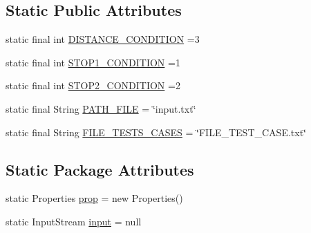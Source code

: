 \subsection*{Static Public Attributes}
\begin{DoxyCompactItemize}
\item 
static final int \hyperlink{classutilities_1_1_data_file_a7db48e719d69b2fb08dec6730949acf9}{D\+I\+S\+T\+A\+N\+C\+E\+\_\+\+C\+O\+N\+D\+I\+T\+I\+ON} =3
\item 
static final int \hyperlink{classutilities_1_1_data_file_a73169a0777ef2c7e224420ab3f4be9dc}{S\+T\+O\+P1\+\_\+\+C\+O\+N\+D\+I\+T\+I\+ON} =1
\item 
static final int \hyperlink{classutilities_1_1_data_file_afdb877fcbb93d5bf2e6757f844c0a0e0}{S\+T\+O\+P2\+\_\+\+C\+O\+N\+D\+I\+T\+I\+ON} =2
\item 
static final String \hyperlink{classutilities_1_1_data_file_ab2cdae484f28934cf77316bbf9af0b72}{P\+A\+T\+H\+\_\+\+F\+I\+LE} = \char`\"{}input.\+txt\char`\"{}
\item 
static final String \hyperlink{classutilities_1_1_data_file_a6d7f06ae7db77b3b202c31190c2281e3}{F\+I\+L\+E\+\_\+\+T\+E\+S\+T\+S\+\_\+\+C\+A\+S\+ES} = \char`\"{}F\+I\+L\+E\+\_\+\+T\+E\+S\+T\+\_\+\+C\+A\+S\+E.\+txt\char`\"{}
\end{DoxyCompactItemize}
\subsection*{Static Package Attributes}
\begin{DoxyCompactItemize}
\item 
static Properties \hyperlink{classutilities_1_1_data_file_a56e3023d87523528a6126799b02b089d}{prop} = new Properties()
\item 
static Input\+Stream \hyperlink{classutilities_1_1_data_file_a80202aa4edd480f4404d9fd4adcedbfc}{input} = null
\end{DoxyCompactItemize}
